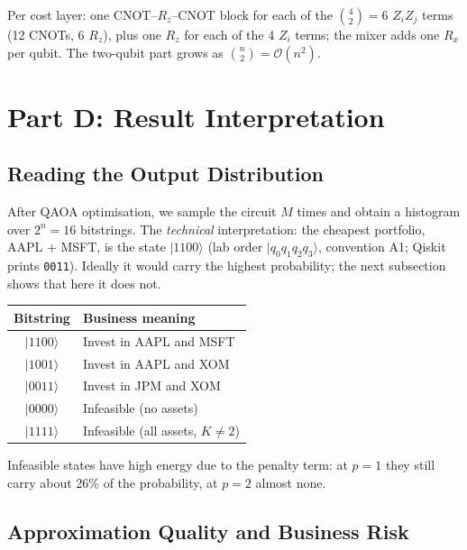 \documentclass[a4paper,11pt]{article}
\newcommand{\ket}[1]{|#1\rangle}
\begin{document}
Per cost layer: one CNOT--$R_z$--CNOT block for each of the
$\binom{4}{2} = 6$ $Z_iZ_j$ terms (12 CNOTs, 6 $R_z$), plus one $R_z$ for
each of the 4 $Z_i$ terms; the mixer adds one $R_x$ per qubit. The
two-qubit part grows as $\binom{n}{2} = \mathcal{O}(n^2)$.

\section{Part D: Result Interpretation}

\subsection{Reading the Output Distribution}

After QAOA optimisation, we sample the circuit $M$ times and obtain a
histogram over $2^n = 16$ bitstrings. The \emph{technical} interpretation:
the cheapest portfolio, AAPL + MSFT, is the state $\ket{1100}$ (lab order
$\ket{q_0q_1q_2q_3}$, convention A1; Qiskit prints \texttt{0011}). Ideally it
would carry the highest probability; the next subsection shows that here it
does not.

\begin{finbox}
\begin{center}
\begin{tabular}{cl}
    \toprule
    Bitstring & Business meaning \\
    \midrule
    $\ket{1100}$ & Invest in AAPL and MSFT \\
    $\ket{1001}$ & Invest in AAPL and XOM \\
    $\ket{0011}$ & Invest in JPM and XOM \\
    $\ket{0000}$ & Infeasible (no assets) \\
    $\ket{1111}$ & Infeasible (all assets, $K \neq 2$) \\
    \bottomrule
\end{tabular}
\end{center}
Infeasible states have high energy due to the penalty term: at $p=1$
they still carry about 26\% of the probability, at $p=2$ almost none.
\end{finbox}

\subsection{Approximation Quality and Business Risk}
\end{document}
